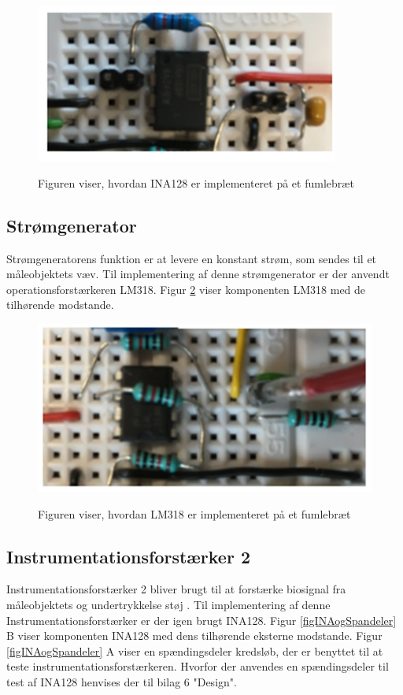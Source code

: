 \begin{figure}[H] 
\centering
{\includegraphics[width=10cm]
{Figure/INA128IM}}
\caption{Figuren viser, hvordan INA128 er implementeret på et fumlebræt  }
\label{figScrip}
\end{figure}



\subsection{Strømgenerator}
Strømgeneratorens funktion er at levere en konstant strøm, som sendes til et måleobjektets væv. Til implementering af denne strømgenerator er der anvendt operationsforstærkeren LM318. Figur \ref{figScrip1}
viser komponenten LM318 med de tilhørende modstande. 
\begin{figure}[H] 
\centering
{\includegraphics[width=\linewidth]
{Figure/LM318IM}}
\caption{Figuren viser, hvordan LM318 er implementeret på et fumlebræt  }
\label{figScrip1}
\end{figure}


\subsection{Instrumentationsforstærker 2}

Instrumentationsforstærker 2 bliver brugt til at forstærke biosignal fra måleobjektets og undertrykkelse støj . Til implementering af denne Instrumentationsforstærker er der igen brugt INA128. Figur \ref{figINAogSpandeler} B viser komponenten INA128 med dens tilhørende eksterne modstande. Figur \ref{figINAogSpandeler} A viser en spændingsdeler kredsløb, der er benyttet til at teste instrumentationsforstærkeren. Hvorfor der anvendes en spændingsdeler til test af INA128 henvises der til bilag 6 "Design". 


